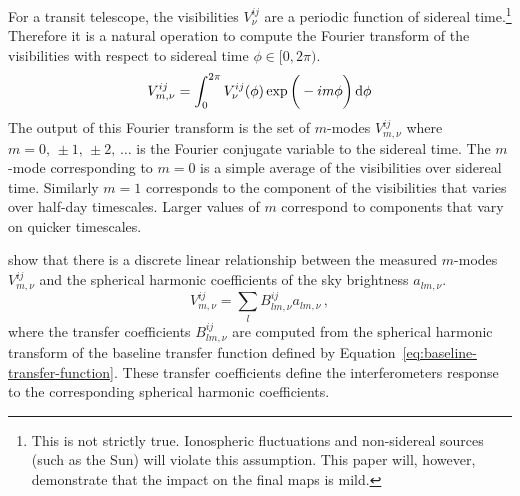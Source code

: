 \documentclass[twocolumn]{aastex61}
\renewcommand{\d}{{\rm d}}
\begin{document}
For a transit telescope, the visibilities $V^{ij}_\nu$ are a periodic function of sidereal
time.\footnote{
    This is not strictly true. Ionospheric fluctuations and non-sidereal sources (such as the Sun)
    will violate this assumption. This paper will, however, demonstrate that the impact on the final
    maps is mild.
}
Therefore it is a natural operation to compute the Fourier transform of the visibilities with
respect to sidereal time $\phi\in[0,2\pi)$.
\begin{equation}
    V^{ij}_{m,\nu} = \int_0^{2\pi} V^{ij}_\nu(\phi)\exp\bigg(-im\phi\bigg)\,\d\phi
\end{equation}
The output of this Fourier transform is the set of $m$-modes $V^{ij}_{m,\nu}$ where
$m=0,\,\pm1,\,\pm2,\,\ldots$ is the Fourier conjugate variable to the sidereal time. The $m$-mode
corresponding to $m=0$ is a simple average of the visibilities over sidereal time. Similarly $m=1$
corresponds to the component of the visibilities that varies over half-day timescales. Larger values
of $m$ correspond to components that vary on quicker timescales.

\citet{2014ApJ...781...57S, 2015PhRvD..91h3514S} show that there is a discrete linear relationship
between the measured $m$-modes $V^{ij}_{m,\nu}$ and the spherical harmonic coefficients of the sky
brightness $a_{lm,\nu}$.
\begin{equation}\label{eq:m-mode-sum-equation}
    V^{ij}_{m,\nu} = \sum_l B^{ij}_{lm,\nu} a_{lm,\nu}\,,
\end{equation}
where the transfer coefficients $B^{ij}_{lm,\nu}$ are computed from the spherical harmonic transform
of the baseline transfer function defined by Equation~\ref{eq:baseline-transfer-function}. These
transfer coefficients define the interferometers response to the corresponding spherical harmonic
coefficients.
\end{document}
